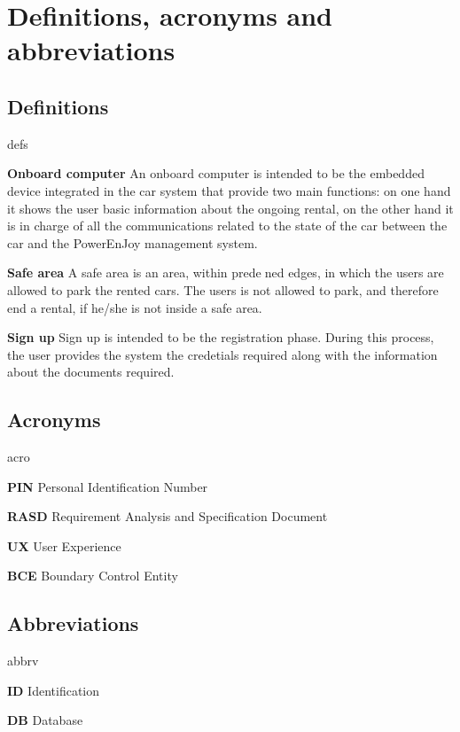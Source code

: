\section{Definitions, acronyms and abbreviations}

\subsection{Definitions}
	\begin{labeling}{defs}
		\item[\textbf{Onboard computer}] An onboard computer is intended to be the embedded device integrated in the car system that provide two main functions: on one hand it shows the user basic information about the ongoing rental, on the other hand it is in charge of all the communications related to the state of the car between the car and the PowerEnJoy management system.
		\item[\textbf{Safe area}] A safe area is an area, within predened edges, in which the users are allowed to park the rented cars. The users is not allowed to park, and therefore end a rental, if he/she is not inside a safe area.
		\item[\textbf{Sign up}] Sign up is intended to be the registration phase. During this process, the user provides the system the credetials required along with the information about the documents required.
	\end{labeling}

\subsection{Acronyms}
	\begin{labeling}{acro}
		\item[\textbf{PIN}] Personal Identification Number
		\item[\textbf{RASD}] Requirement Analysis and Specification Document
		\item[\textbf{UX}] User Experience
		\item[\textbf{BCE}] Boundary Control Entity
	\end{labeling}

\subsection{Abbreviations}
	\begin{labeling}{abbrv}
		\item[\textbf{ID}] Identification
		\item[\textbf{DB}] Database
	\end{labeling}